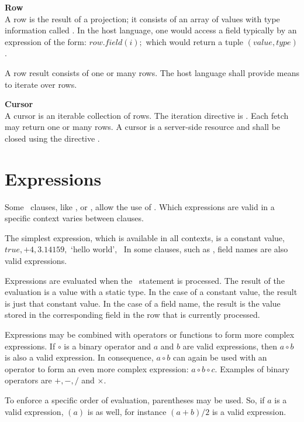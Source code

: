 \begin{minipage}{\textwidth}
\textbf{Row}\\
A row is the result of a projection;
it consists of an array of values
with type information called .
In the host language, one would access a field
typically by an expression of the form:
$row.field(i);$
which would return a tuple $(value,type)$.

A row result consists of one or many rows.
The host language shall provide means
to iterate over rows.
\end{minipage}

\begin{minipage}{\textwidth}
\textbf{Cursor}\\
A cursor is an iterable collection of rows.
The iteration directive is .
Each fetch may return one or many rows.
A cursor is a server-side resource
and shall be closed using the directive .
\end{minipage}

\section{Expressions}
Some \sql\ clauses, like , 
 or ,
allow the use of .
Which expressions are valid 
in a specific context varies between
clauses.

The simplest expression,
which is available in all contexts,
is a constant value,
\eg\ $true, +4, 3.14159,$ `hello world', \etc\
In some clauses, such as ,
field names are also valid expressions.

Expressions are evaluated when the
\sql\ statement is processed.
The result of the evaluation is
a value with a static type.
In the case of a constant value,
the result is just that constant value.
In the case of a field name,
the result is the value stored in
the corresponding field in the
row that is currently processed.

Expressions may be combined
with operators or functions
to form more complex expressions.
If $\circ$ is a binary operator
and $a$ and $b$ are valid expressions,
then
$a \circ b$
is also a valid expression.
In consequence, $a \circ b$ can
again be used with an operator
to form an even more complex
expression:
$a \circ b \circ c$.
Examples of binary operators are
$+, -, /$ and $\times$.

To enforce a specific order of
evaluation, parentheses may be used.
So, if $a$ is a valid expression,
$(a)$ is as well, for instance
$(a+b)/2$
is a valid expression.

